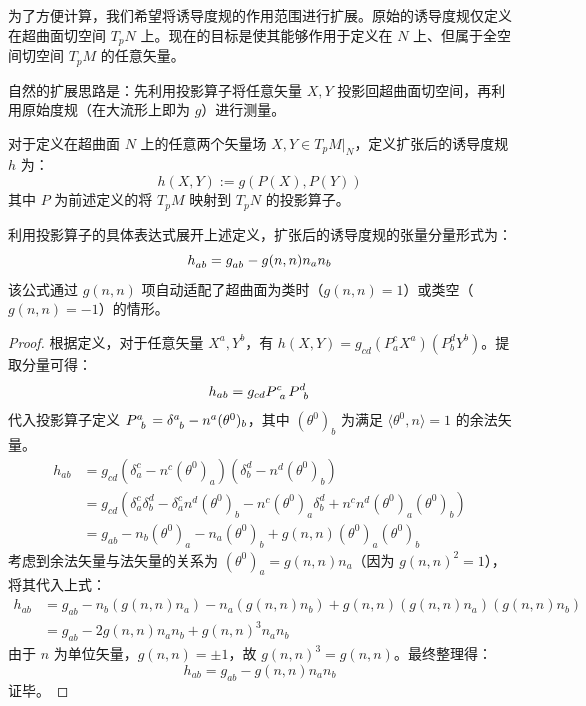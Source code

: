 为了方便计算，我们希望将诱导度规的作用范围进行扩展。原始的诱导度规仅定义在超曲面切空间 $T_p N$ 上。现在的目标是使其能够作用于定义在 $N$ 上、但属于全空间切空间 $T_p M$ 的任意矢量。

自然的扩展思路是：先利用投影算子将任意矢量 $X, Y$ 投影回超曲面切空间，再利用原始度规（在大流形上即为 $g$）进行测量。

\begin{definition}[扩张的诱导度规]
    对于定义在超曲面 $N$ 上的任意两个矢量场 $X, Y \in T_p M |_N$，定义扩张后的诱导度规 $h$ 为：
    \begin{equation}
        h(X, Y) := g(P(X), P(Y))
    \end{equation}
    其中 $P$ 为前述定义的将 $T_p M$ 映射到 $T_p N$ 的投影算子。
\end{definition}

\begin{theorem}[诱导度规的分量形式]
    利用投影算子的具体表达式展开上述定义，扩张后的诱导度规的张量分量形式为：
    \begin{equation}
        \tensor{h}{_{ab}} = \tensor{g}{_{ab}} - g(n, n) n_a n_b
    \end{equation}
    该公式通过 $g(n,n)$ 项自动适配了超曲面为类时（$g(n,n)=1$）或类空（$g(n,n)=-1$）的情形。
\end{theorem}

\begin{proof}
    根据定义，对于任意矢量 $X^a, Y^b$，有 $h(X, Y) = g_{cd} (P^c_a X^a) (P^d_b Y^b)$。提取分量可得：
    \begin{equation}
        h_{ab} = g_{cd} \tensor{P}{^c_a} \tensor{P}{^d_b}
    \end{equation}
    代入投影算子定义 $\tensor{P}{^a_b} = \tensor{\delta}{^a_b} - n^a (\theta^0)_b$，其中 $(\theta^0)_b$ 为满足 $\langle \theta^0, n \rangle = 1$ 的余法矢量。
    \begin{align*}
        h_{ab} &= g_{cd} (\delta^c_a - n^c (\theta^0)_a) (\delta^d_b - n^d (\theta^0)_b) \\
        &= g_{cd} (\delta^c_a \delta^d_b - \delta^c_a n^d (\theta^0)_b - n^c (\theta^0)_a \delta^d_b + n^c n^d (\theta^0)_a (\theta^0)_b) \\
        &= g_{ab} - n_b (\theta^0)_a - n_a (\theta^0)_b + g(n, n) (\theta^0)_a (\theta^0)_b
    \end{align*}
    考虑到余法矢量与法矢量的关系为 $(\theta^0)_a = g(n, n) n_a$（因为 $g(n,n)^2 = 1$），将其代入上式：
    \begin{align*}
        h_{ab} &= g_{ab} - n_b (g(n,n) n_a) - n_a (g(n,n) n_b) + g(n,n) (g(n,n) n_a) (g(n,n) n_b) \\
        &= g_{ab} - 2g(n,n) n_a n_b + g(n,n)^3 n_a n_b
    \end{align*}
    由于 $n$ 为单位矢量，$g(n,n) = \pm 1$，故 $g(n,n)^3 = g(n,n)$。最终整理得：
    \begin{equation*}
        h_{ab} = g_{ab} - g(n,n) n_a n_b
    \end{equation*}
    证毕。
\end{proof}


